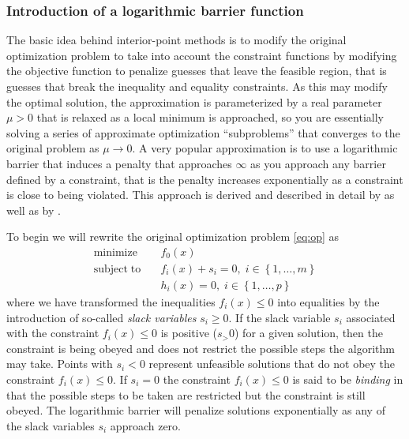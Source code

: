 \subsubsection*{Introduction of a logarithmic barrier function}
The basic idea behind interior-point methods is to modify the original optimization problem to take into account the constraint functions by modifying the objective function to penalize guesses that leave the feasible region, that is guesses that break the inequality and equality constraints. As this may modify the optimal solution, the approximation is parameterized by a real parameter $\mu > 0$ that is relaxed as a local minimum is approached, so you are essentially solving a series of approximate optimization ``subproblems'' that converges to the original problem as $\mu \rightarrow 0$. A very popular approximation is to use a logarithmic barrier that induces a penalty that approaches $\infty$ as you approach any barrier defined by a constraint, that is the penalty increases exponentially as a constraint is close to being violated. This approach is derived and described in detail by \citet{Byrd99,Byrd00,Waltz06} as well as by \citet[ch. 19]{Nocedal06}.

To begin we will rewrite the original optimization problem \eqref{eq:op} as
\begin{align}
\mathrm{minimize}   \quad & f_0(x) \nonumber \\
\mathrm{subject\;to} \quad &
f_i(x) + s_i = 0, \; i \in \left\{1, \dots, m \right\}\\
& h_i(x) = 0, \; i \in \left\{1, \dots, p \right\} \nonumber
\end{align}
where we have transformed the inequalities $f_i(x) \le 0$ into equalities by the introduction of so-called \emph{slack variables} $s_i \ge 0$. If the slack variable $s_i$ associated with the constraint $f_i(x) \le 0$ is positive ($s_ > 0$) for a given solution, then the constraint is being obeyed and does not restrict the possible steps the algorithm may take. Points with $s_i < 0$ represent unfeasible solutions that do not obey the constraint $f_i(x) \le 0$. If $s_i = 0$ the constraint $f_i(x) \le 0$ is said to be \emph{binding} in that the possible steps to be taken are restricted but the constraint is still obeyed. The logarithmic barrier will penalize solutions exponentially as any of the slack variables $s_i$ approach zero.

